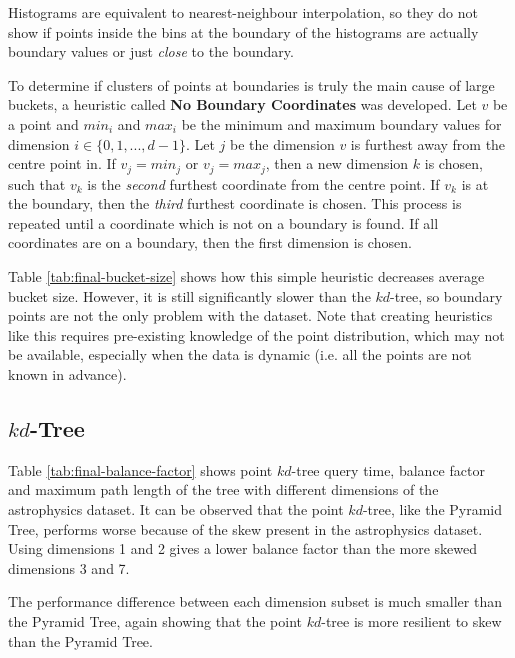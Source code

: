 Histograms are equivalent to nearest-neighbour interpolation, so they do not show if points inside the bins at the boundary of the histograms are actually boundary values or just \textit{close} to the boundary.

To determine if clusters of points at boundaries is truly the main cause of large buckets, a heuristic called \textbf{No Boundary Coordinates} was developed. Let $v$ be a point and $min_i$ and $max_i$ be the minimum and maximum boundary values for dimension $i \in \lbrace 0, 1, ..., d - 1 \rbrace$. Let $j$ be the dimension $v$ is furthest away from the centre point in. If $v_j = min_j$ or $v_j = max_j$, then a new dimension $k$ is chosen, such that $v_k$ is the \textit{second} furthest coordinate from the centre point. If $v_k$ is at the boundary, then the \textit{third} furthest coordinate is chosen. This process is repeated until a coordinate which is not on a boundary is found. If all coordinates are on a boundary, then the first dimension is chosen.

Table \ref{tab:final-bucket-size} shows how this simple heuristic decreases average bucket size. However, it is still significantly slower than the $kd$-tree, so boundary points are not the only problem with the dataset. Note that creating heuristics like this requires pre-existing knowledge of the point distribution, which may not be available, especially when the data is dynamic (i.e. all the points are not known in advance).

\subsection{$kd$-Tree}

Table \ref{tab:final-balance-factor} shows point $kd$-tree query time, balance factor and maximum path length of the tree with different dimensions of the astrophysics dataset. It can be observed that the point $kd$-tree, like the Pyramid Tree, performs worse because of the skew present in the astrophysics dataset. Using dimensions 1 and 2 gives a lower balance factor than the more skewed dimensions 3 and 7.

The performance difference between each dimension subset is much smaller than the Pyramid Tree, again showing that the point $kd$-tree is more resilient to skew than the Pyramid Tree.

\begin{table}
	\centering
	\caption{Point $kd$-tree Statistics with Different Dimensions of Astrophysics Dataset}
	\label{tab:final-balance-factor}
\end{table}

